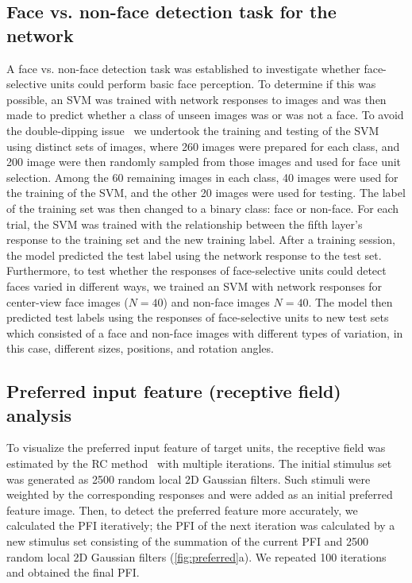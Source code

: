 \documentclass[sn-mathphys-num]{sn-jnl}%
\theoremstyle{thmstyleone}%
\theoremstyle{thmstyletwo}%
\theoremstyle{thmstylethree}%
\begin{document}
\subsection{Face vs. non-face detection task for the network}
A face vs. non-face detection task was established to investigate whether face-selective units could perform basic face perception.
To determine if this was possible, an SVM was trained with network responses to images and was then made to predict whether a class of unseen images was or was not a face.
To avoid the double-dipping issue~\cite{kriegeskorte2009circular} we undertook the training and testing of the SVM using distinct sets of images, 
where 260 images were prepared for each class, 
and 200 image were then randomly sampled from those images and used for face unit selection.
Among the 60 remaining images in each class, 40 images were used for the training of the SVM, 
and the other 20 images were used for testing.
The label of the training set was then changed to a binary class: face or non-face.
For each trial, the SVM was trained with the relationship between the fifth layer's response to the training set and the new training label.
After a training session, the model predicted the test label using the network response to the test set.
Furthermore, to test whether the responses of face-selective units could detect faces varied in different ways, 
we trained an SVM with network responses for center-view face images ($ N = 40 $) and non-face images $ N = 40 $.
The model then predicted test labels using the responses of face-selective units to new test sets which consisted of a face and non-face images with different types of variation, in this case, different sizes, positions, and rotation angles.


\subsection{Preferred input feature (receptive field) analysis} \label{sec:preferred}
To visualize the preferred input feature of target units, the receptive field was estimated by the RC method~\cite{bonin2011local} with multiple iterations.
The initial stimulus set was generated as 2500 random local 2D Gaussian filters.
Such stimuli were weighted by the corresponding responses and were added as an initial preferred feature image.
Then, to detect the preferred feature more accurately, we calculated the PFI iteratively;
the PFI of the next iteration was calculated by a new stimulus set consisting of the summation of the current PFI and 2500 random local 2D Gaussian filters (\ref{fig:preferred}a).
We repeated 100 iterations and obtained the final PFI.
\end{document}
